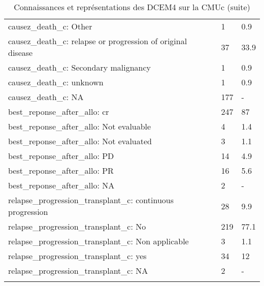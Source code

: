 \documentclass{article}
\begin{document}
\begin{longtable}{lll}
  causez_death_c: Other & 1 & 0.9 \\ 
  causez_death_c: relapse or progression of original disease & 37 & 33.9 \\ 
  causez_death_c: Secondary malignancy & 1 & 0.9 \\ 
  causez_death_c: unknown & 1 & 0.9 \\ 
  causez_death_c: NA & 177 & - \\ 
  best_reponse_after_allo: cr & 247 & 87 \\ 
  best_reponse_after_allo: Not evaluable & 4 & 1.4 \\ 
  best_reponse_after_allo: Not evaluated & 3 & 1.1 \\ 
  best_reponse_after_allo: PD & 14 & 4.9 \\ 
  best_reponse_after_allo: PR & 16 & 5.6 \\ 
  best_reponse_after_allo: NA & 2 & - \\ 
  relapse_progression_transplant_c: continuous progression & 28 & 9.9 \\ 
  relapse_progression_transplant_c: No & 219 & 77.1 \\ 
  relapse_progression_transplant_c: Non applicable  & 3 & 1.1 \\ 
  relapse_progression_transplant_c: yes & 34 & 12 \\ 
  relapse_progression_transplant_c: NA & 2 & - \\ 
   \hline
\hline
\caption{Connaissances et représentations des DCEM4 sur la CMUc (suite)} 
\label{tab:connaissance2}
\end{longtable}
\end{document}
